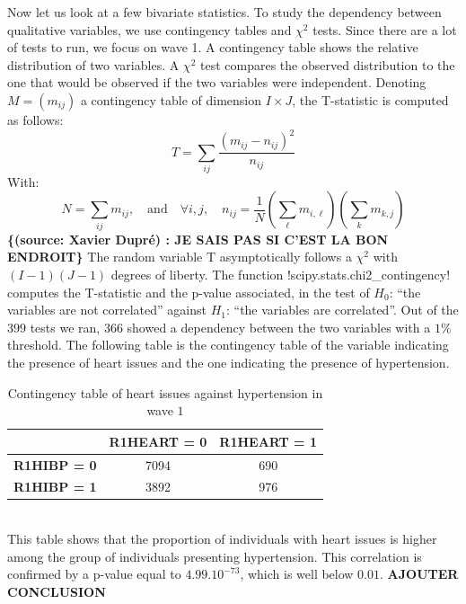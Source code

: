\documentclass[]{article}
\begin{document}
\noindent
Now let us look at a few bivariate statistics. To study the dependency between qualitative variables, we use contingency tables and $\chi^2$ tests. Since there are a lot of tests to run, we focus on wave 1. A contingency table shows the relative distribution of two variables. A $\chi^2$ test compares the observed distribution to the one that would be observed if the two variables were independent. Denoting $M=(m_{ij})$ a contingency table of dimension $I\times J$, the T-statistic is computed as follows: 
\begin{equation}
	T = \sum_{ij}\frac{(m_{ij}-n_{ij})^2}{n_{ij}}
\end{equation}
With:
\begin{equation}
	N=\sum_{ij}m_{ij}, \quad \text{and}\quad \forall i,j,\quad n_{ij} = \frac{1}{N} \left(\sum_{\ell}m_{i,\ell}\right) \left(\sum_{k}m_{k,j}\right) 
\end{equation}
\textbf{\{(source: Xavier Dupré) : JE SAIS PAS SI C'EST LA BON ENDROIT\}}
The random variable T asymptotically follows a $\chi^2$ with $(I-1)(J-1)$ degrees of liberty. The function \pyth!scipy.stats.chi2_contingency! computes the T-statistic and the p-value associated, in the test of $H_0$: “the variables are not correlated” against $H_1$: “the variables are correlated”.
Out of the $399$ tests we ran, $366$ showed a dependency between the two variables with a $1\%$ threshold. The following table is the contingency table of the variable indicating the presence of heart issues and the one indicating the presence of hypertension.
\begin{table}[!h]
	\centering
	\begin{tabular}{|c|c|c|}
		\hline
		& \textbf{R1HEART = 0} & \textbf{R1HEART = 1} \\
		\hline
		\textbf{R1HIBP = 0} & 7094 & 690 \\
		\hline
		\textbf{R1HIBP = 1} & 3892 & 976 \\
		\hline
	\end{tabular}
	\caption{Contingency table of heart issues against hypertension in wave $1$}
\end{table}\\
This table shows that the proportion of individuals with heart issues is higher among the group of individuals presenting hypertension. This correlation is confirmed by a p-value equal to $4.99.10^{-73}$, which is well below $0.01$. \textbf{AJOUTER CONCLUSION}
\end{document}
